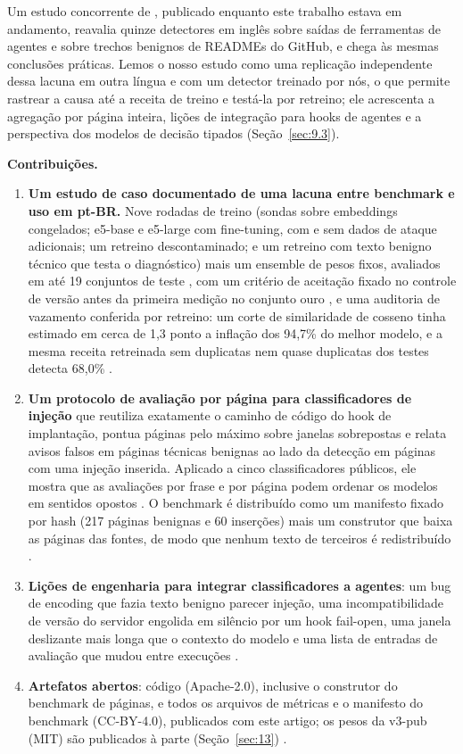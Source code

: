 \documentclass[11pt]{article}
\begin{document}
Um estudo concorrente de \citet{liu2026passing}, publicado enquanto este trabalho estava em andamento, reavalia quinze detectores em inglês sobre saídas de ferramentas de agentes e sobre trechos benignos de READMEs do GitHub, e chega às mesmas conclusões práticas. Lemos o nosso estudo como uma replicação independente dessa lacuna em outra língua e com um detector treinado por nós, o que permite rastrear a causa até a receita de treino e testá-la por retreino; ele acrescenta a agregação por página inteira, lições de integração para hooks de agentes e a perspectiva dos modelos de decisão tipados (Seção~\ref{sec:9.3}).

\textbf{Contribuições.}

\begin{enumerate}
\item \textbf{Um estudo de caso documentado de uma lacuna entre benchmark e uso em pt-BR.} Nove rodadas de treino (sondas sobre embeddings congelados; e5-base e e5-large com fine-tuning, com e sem dados de ataque adicionais; um retreino descontaminado; e um retreino com texto benigno técnico que testa o diagnóstico) mais um ensemble de pesos fixos, avaliados em até 19 conjuntos de teste%
, com um critério de aceitação fixado no controle de versão antes da primeira medição no conjunto ouro%
, e uma auditoria de vazamento conferida por retreino: um corte de similaridade de cosseno tinha estimado em cerca de 1,3 ponto a inflação dos 94,7\% do melhor modelo, e a mesma receita retreinada sem duplicatas nem quase duplicatas dos testes detecta 68,0\%%
.
\item \textbf{Um protocolo de avaliação por página para classificadores de injeção} que reutiliza exatamente o caminho de código do hook de implantação, pontua páginas pelo máximo sobre janelas sobrepostas e relata avisos falsos em páginas técnicas benignas ao lado da detecção em páginas com uma injeção inserida. Aplicado a cinco classificadores públicos, ele mostra que as avaliações por frase e por página podem ordenar os modelos em sentidos opostos%
. O benchmark é distribuído como um manifesto fixado por hash (217 páginas benignas e 60 inserções) mais um construtor que baixa as páginas das fontes, de modo que nenhum texto de terceiros é redistribuído%
.
\item \textbf{Lições de engenharia para integrar classificadores a agentes}: um bug de encoding que fazia texto benigno parecer injeção, uma incompatibilidade de versão do servidor engolida em silêncio por um hook fail-open, uma janela deslizante mais longa que o contexto do modelo %
e uma lista de entradas de avaliação que mudou entre execuções%
.
\item \textbf{Artefatos abertos}: código (Apache-2.0), inclusive o construtor do benchmark de páginas, e todos os arquivos de métricas e o manifesto do benchmark (CC-BY-4.0), publicados com este artigo; os pesos da v3-pub (MIT) são publicados à parte (Seção~\ref{sec:13})%
.
\end{enumerate}
\end{document}
